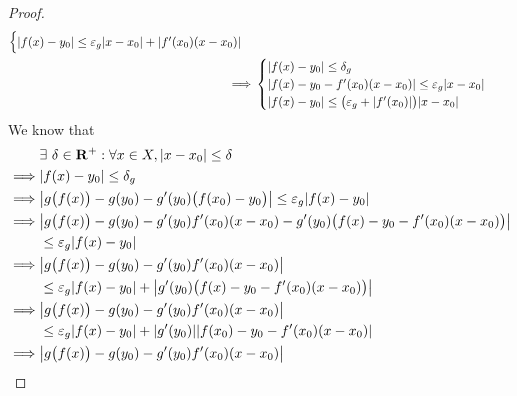 \begin{proof}
\begin{align*}
\begin{cases}
                       \abs{f(x) - y_0} \leq \varepsilon_g \abs{x - x_0} + \abs{f'(x_0) (x - x_0)}
                   \end{cases}                                                \\
        \implies & \begin{cases}
                       \abs{f(x) - y_0} \leq \delta_g                                        \\
                       \abs{f(x) - y_0 - f'(x_0) (x - x_0)} \leq \varepsilon_g \abs{x - x_0} \\
                       \abs{f(x) - y_0} \leq \big(\varepsilon_g + \abs{f'(x_0)}\big) \abs{x - x_0}
                   \end{cases}
    \end{align*}
    We know that
    \begin{align*}
                 & \exists\ \delta \in \R^+ : \forall x \in X, \abs{x - x_0} \leq \delta                                                \\
        \implies & \abs{f(x) - y_0} \leq \delta_g                                                                                       \\
        \implies & \abs{g\big(f(x)\big) - g(y_0) - g'(y_0) \big(f(x_0) - y_0\big)} \leq \varepsilon_g \abs{f(x) - y_0}                  \\
        \implies & \abs{g\big(f(x)\big) - g(y_0) - g'(y_0) f'(x_0) (x - x_0) - g'(y_0) \big(f(x) - y_0 - f'(x_0) (x - x_0)\big)}        \\
                 & \leq \varepsilon_g \abs{f(x) - y_0}                                                                                  \\
        \implies & \abs{g\big(f(x)\big) - g(y_0) - g'(y_0) f'(x_0) (x - x_0)}                                                           \\
                 & \leq \varepsilon_g \abs{f(x) - y_0} + \abs{g'(y_0) \big(f(x) - y_0 - f'(x_0) (x - x_0)\big)}                         \\
        \implies & \abs{g\big(f(x)\big) - g(y_0) - g'(y_0) f'(x_0) (x - x_0)}                                                           \\
                 & \leq \varepsilon_g \abs{f(x) - y_0} + \abs{g'(y_0)} \abs{f(x_0) - y_0 - f'(x_0) (x - x_0)}                           \\
        \implies & \abs{g\big(f(x)\big) - g(y_0) - g'(y_0) f'(x_0) (x - x_0)}                                                           \\

\end{align*}
\end{proof}
